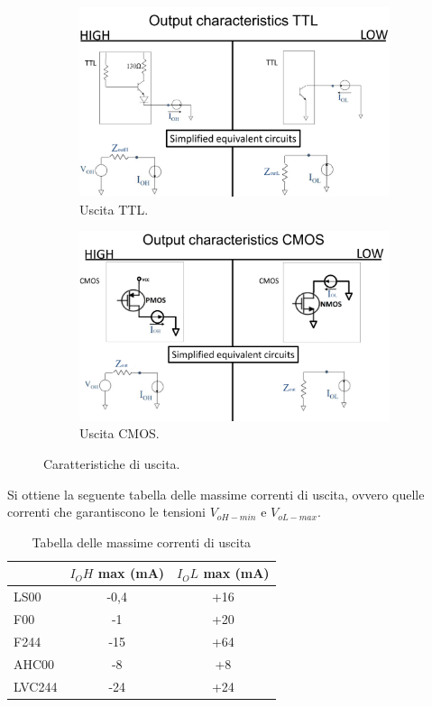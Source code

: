 \documentclass[
]{book}
\begin{document}
\begin{figure}[H]
\centering
\begin{subfigure}{0.4\textwidth}
\includegraphics[width=\textwidth]{assets/imgs/output_ttl.png}
\caption{Uscita TTL.}
\end{subfigure}
\hfill
\begin{subfigure}{0.4\textwidth}
\includegraphics[width=\textwidth]{assets/imgs/output_cmos.png}
\caption{Uscita CMOS.}
\end{subfigure}
\caption{Caratteristiche di uscita.}
\end{figure}

Si ottiene la seguente tabella delle massime correnti di uscita, ovvero
quelle correnti che garantiscono le tensioni \(V_{oH-min}\) e
\(V_{oL-max}\).

\begin{table}
\centering
\begin{tabular}{l|cc}
 & $I_OH$ max (mA) & $I_OL$ max (mA) \\ 
\hline
LS00 & -0,4 & +16 \\
F00 & -1 & +20 \\
F244 & -15 & +64 \\
AHC00 & -8 & +8 \\
LVC244 & -24 & +24
\end{tabular}
\caption{Tabella delle massime correnti di uscita}
\end{table}
\end{document}
